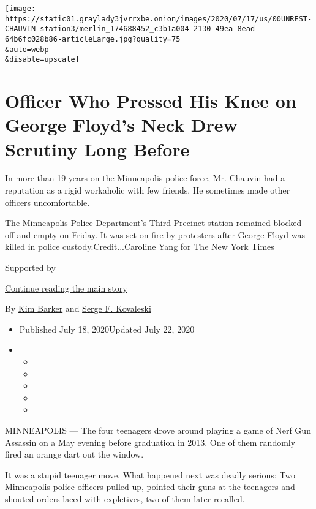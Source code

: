 \texttt{[image: https://static01.graylady3jvrrxbe.onion/images/2020/07/17/us/00UNREST-CHAUVIN-station3/merlin\_174688452\_c3b1a004-2130-49ea-8ead-64b6fc028b86-articleLarge.jpg?quality=75\\\&auto=webp\\\&disable=upscale]}

\hypertarget{officer-who-pressed-his-knee-on-george-floyds-neck-drew-scrutiny-long-before}{%
\section{Officer Who Pressed His Knee on George Floyd's Neck Drew
Scrutiny Long
Before}\label{officer-who-pressed-his-knee-on-george-floyds-neck-drew-scrutiny-long-before}}

In more than 19 years on the Minneapolis police force, Mr. Chauvin had a
reputation as a rigid workaholic with few friends. He sometimes made
other officers uncomfortable.

The Minneapolis Police Department's Third Precinct station remained
blocked off and empty on Friday. It was set on fire by protesters after
George Floyd was killed in police custody.Credit...Caroline Yang for The
New York Times

Supported by

\protect\hyperlink{after-sponsor}{Continue reading the main story}

By \href{https://www.nytimes3xbfgragh.onion/by/kim-barker}{Kim Barker}
and \href{https://www.nytimes3xbfgragh.onion/by/serge-f-kovaleski}{Serge
F. Kovaleski}

\begin{itemize}
\item
  Published July 18, 2020Updated July 22, 2020
\item
  \begin{itemize}
  \item
  \item
  \item
  \item
  \item
  \end{itemize}
\end{itemize}

MINNEAPOLIS --- The four teenagers drove around playing a game of Nerf
Gun Assassin on a May evening before graduation in 2013. One of them
randomly fired an orange dart out the window.

It was a stupid teenager move. What happened next was deadly serious:
Two
\href{https://www.nytimes3xbfgragh.onion/2020/07/29/us/george-floyd-memorial.html}{Minneapolis}
police officers pulled up, pointed their guns at the teenagers and
shouted orders laced with expletives, two of them later recalled.

